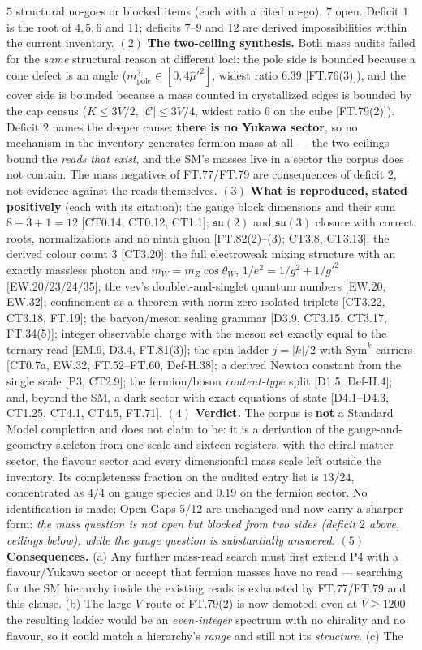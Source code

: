 \documentclass[11pt,openany]{report}
\theoremstyle{canonplain}
\theoremstyle{canondef}
\begin{document}
$5$ structural no-goes or blocked items (each with a cited no-go), $7$ open. Deficit $1$ is the root of $4,5,6$ and $11$; deficits $7$–$9$ and $12$ are derived impossibilities within the current inventory. $(2)$ \textbf{The two-ceiling synthesis.} Both mass audits failed for the \textit{same} structural reason at different loci: the pole side is bounded because a cone defect is an angle ($m^2_{\mathrm{pole}}\in[0,4\hat\mu'^2]$, widest ratio $6.39$ [FT.76(3)]), and the cover side is bounded because a mass counted in crystallized edges is bounded by the cap census ($K\le3V/2$, $|\mathcal C|\le3V/4$, widest ratio $6$ on the cube [FT.79(2)]). Deficit $2$ names the deeper cause: \textbf{there is no Yukawa sector}, so no mechanism in the inventory generates fermion mass at all — the two ceilings bound the \textit{reads that exist}, and the SM's masses live in a sector the corpus does not contain. The mass negatives of FT.77/FT.79 are consequences of deficit $2$, not evidence against the reads themselves. $(3)$ \textbf{What is reproduced, stated positively} (each with its citation): the gauge block dimensions and their sum $8+3+1=12$ [CT0.14, CT0.12, CT1.1]; $\mathfrak{su}(2)$ and $\mathfrak{su}(3)$ closure with correct roots, normalizations and no ninth gluon [FT.82(2)–(3); CT3.8, CT3.13]; the derived colour count $3$ [CT3.20]; the full electroweak mixing structure with an exactly massless photon and $m_W=m_Z\cos\theta_W$, $1/e^2=1/g^2+1/g'^2$ [EW.20/23/24/35]; the vev's doublet-and-singlet quantum numbers [EW.20, EW.32]; confinement as a theorem with norm-zero isolated triplets [CT3.22, CT3.18, FT.19]; the baryon/meson sealing grammar [D3.9, CT3.15, CT3.17, FT.34(5)]; integer observable charge with the meson set exactly equal to the ternary read [EM.9, D3.4, FT.81(3)]; the spin ladder $j=|k|/2$ with $\mathrm{Sym}^k$ carriers [CT0.7a, EW.32, FT.52–FT.60, Def-H.38]; a derived Newton constant from the single scale [P3, CT2.9]; the fermion/boson \textit{content-type} split [D1.5, Def-H.4]; and, beyond the SM, a dark sector with exact equations of state [D4.1–D4.3, CT1.25, CT4.1, CT4.5, FT.71]. $(4)$ \textbf{Verdict.} The corpus is \textbf{not} a Standard Model completion and does not claim to be: it is a derivation of the gauge-and-geometry skeleton from one scale and sixteen registers, with the chiral matter sector, the flavour sector and every dimensionful mass scale left outside the inventory. Its completeness fraction on the audited entry list is $13/24$, concentrated as $4/4$ on gauge species and $0.19$ on the fermion sector. No identification is made; Open Gaps 5/12 are unchanged and now carry a sharper form: \textit{the mass question is not open but blocked from two sides (deficit $2$ above, ceilings below), while the gauge question is substantially answered.} $(5)$ \textbf{Consequences.} (a) Any further mass-read search must first extend P4 with a flavour/Yukawa sector or accept that fermion masses have no read — searching for the SM hierarchy inside the existing reads is exhausted by FT.77/FT.79 and this clause. (b) The large-$V$ route of FT.79(2) is now demoted: even at $V\ge1200$ the resulting ladder would be an \textit{even-integer} spectrum with no chirality and no flavour, so it could match a hierarchy's \textit{range} and still not its \textit{structure}. (c) The 
\end{document}
